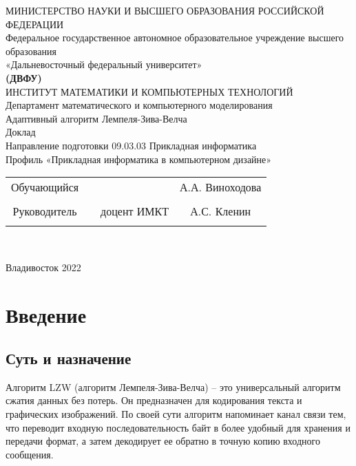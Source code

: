 \documentclass[a4paper]{article}
\begin{document}
\begin{center}
\hfill \break
\large{МИНИСТЕРСТВО НАУКИ И ВЫСШЕГО ОБРАЗОВАНИЯ РОССИЙСКОЙ ФЕДЕРАЦИИ}\\
\footnotesize{Федеральное государственное автономное образовательное учреждение высшего образования}\\ 
\footnotesize{«Дальневосточный федеральный университет»}\\
\small{\textbf{(ДВФУ)}}\\
\hfill \break
\normalsize{ИНСТИТУТ МАТЕМАТИКИ И КОМПЬЮТЕРНЫХ ТЕХНОЛОГИЙ}\\
 \hfill \break
\normalsize{Департамент математического и компьютерного моделирования}\\
\hfill\break
\hfill \break
\hfill \break
\hfill \break
\large{Адаптивный алгоритм Лемпеля-Зива-Велча}\\
\hfill \break
\hfill \break
\hfill \break
\normalsize{Доклад\\
\hfill \break
Направление подготовки 09.03.03 Прикладная информатика\\
\hfill \break
Профиль «Прикладная информатика в компьютерном дизайне»}\\
\hfill \break
\hfill \break
\end{center}
\normalsize{} \hfill \break
\hfill \break
\normalsize{ 
\begin{tabular}{cccc}
Обучающийся & \underline{\hspace{3cm}} & &А.А. Виноходова \\\\
Руководитель & \underline{\hspace{3cm}}& доцент ИМКТ &А.С. Кленин \\\\
\end{tabular}
}\\
\hfill \break
\hfill \break
\begin{center} Владивосток 2022 \end{center}
\thispagestyle{empty} 
\newpage
     
    \tableofcontents 
\newpage
\newpage
\section{Введение}

\subsection{Суть и назначение}

Алгоритм LZW (алгоритм Лемпеля-Зива-Велча) – это универсальный алгоритм сжатия данных без потерь. Он предназначен для кодирования текста и графических изображений. По своей сути алгоритм напоминает канал связи тем, что переводит входную последовательность байт в более удобный для хранения и передачи формат, а затем декодирует ее обратно в точную копию входного сообщения.
\end{document}
